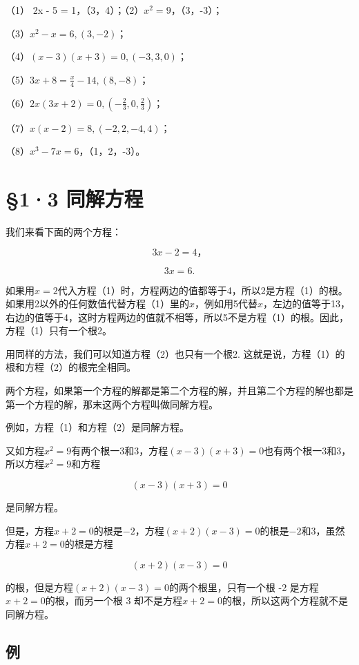 （1） 2x - 5 = 1，（3，4）；（2）\(x^{2} = 9\)，（3，-3）；

（3）\(x^{2} - x = 6, (3, -2)\)；

（4）\((x - 3)(x + 3) = 0, (-3, 3, 0)\)；

（5）\(3x + 8 = \frac{x}{4} - 14, (8, -8)\)；

（6）\(2x(3x + 2) = 0, \left(-\frac{2}{3}, 0, \frac{2}{3}\right)\)；

（7）\(x(x - 2) = 8, (-2, 2, -4, 4)\)；

（8）\(x^{3} - 7x = 6\)，（1，2，-3）。

\section{§1·3 同解方程}

我们来看下面的两个方程：

\[
3 x - 2 = 4\text{，} \tag{1}
\]

\[
3 x = 6. \tag{2}
\]

如果用\(x = 2\)代入方程（1）时，方程两边的值都等于4，所以2是方程（1）的根。如果用2以外的任何数值代替方程（1）里的\(x\)，例如用5代替\(x\)，左边的值等于13，右边的值等于4，这时方程两边的值就不相等，所以5不是方程（1）的根。因此，方程（1）只有一个根2。

用同样的方法，我们可以知道方程（2）也只有一个根2.
这就是说，方程（1）的根和方程（2）的根完全相同。

两个方程，如果第一个方程的解都是第二个方程的解，并且第二个方程的解也都是第一个方程的解，那末这两个方程叫做同解方程。

例如，方程（1）和方程（2）是同解方程。

又如方程\(x^{2} = 9\)有两个根一3和3，方程\((x - 3)(x + 3) = 0\)也有两个根一3和3，所以方程\(x^{2} = 9\)和方程

\[
(x - 3) (x + 3) = 0
\]

是同解方程。

但是，方程\(x + 2 = 0\)的根是\(-2\)，方程\((x + 2)(x - 3) = 0\)的根是\(-2\)和\(3\)，虽然方程\(x + 2 = 0\)的根是方程

\[
(x + 2) (x - 3) = 0
\]

的根，但是方程\((x + 2)(x - 3) = 0\)的两个根里，只有一个根 -2
是方程\(x + 2 = 0\)的根，而另一个根 3
却不是方程\(x + 2 = 0\)的根，所以这两个方程就不是同解方程。

\subsection{例}

